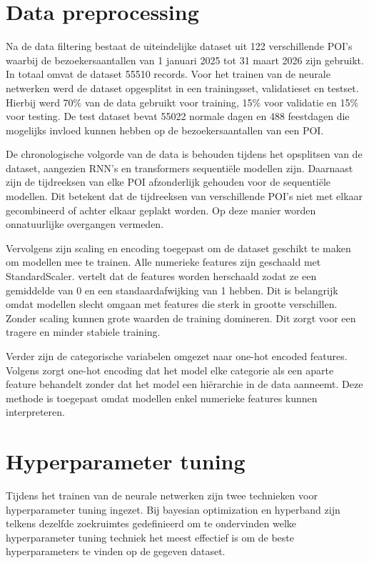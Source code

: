 \section{Data preprocessing}

Na de data filtering bestaat de uiteindelijke dataset uit 122 verschillende POI’s waarbij de bezoekersaantallen van 1 januari 2025 tot 31 maart 2026 zijn gebruikt. In totaal omvat de dataset 55510 records. Voor het trainen van de neurale netwerken werd de dataset opgesplitst in een trainingsset, validatieset en testset. Hierbij werd 70\% van de data gebruikt voor training, 15\% voor validatie en 15\% voor testing. De test dataset bevat 55022 normale dagen en 488 feestdagen die mogelijks invloed kunnen hebben op de bezoekersaantallen van een POI.

De chronologische volgorde van de data is behouden tijdens het opsplitsen van de dataset, aangezien RNN’s en transformers sequentiële modellen zijn. Daarnaast zijn de tijdreeksen van elke POI afzonderlijk gehouden voor de sequentiële modellen. Dit betekent dat de tijdreeksen van verschillende POI’s niet met elkaar gecombineerd of achter elkaar geplakt worden. Op deze manier worden onnatuurlijke overgangen vermeden.

Vervolgens zijn scaling en encoding toegepast om de dataset geschikt te maken om modellen mee te trainen. Alle numerieke features zijn geschaald met StandardScaler. \textcite{Amorim2022} vertelt dat de features worden herschaald zodat ze een gemiddelde van 0 en een standaardafwijking van 1 hebben. Dit is belangrijk omdat modellen slecht omgaan met features die sterk in grootte verschillen. Zonder scaling kunnen grote waarden de training domineren. Dit zorgt voor een tragere en minder stabiele training.

Verder zijn de categorische variabelen omgezet naar one-hot encoded features. Volgens \textcite{JIS2024} zorgt one-hot encoding dat het model elke categorie als een aparte feature behandelt zonder dat het model een hiërarchie in de data aanneemt. Deze methode is toegepast omdat modellen enkel numerieke features kunnen interpreteren.

\section{Hyperparameter tuning}
Tijdens het trainen van de neurale netwerken zijn twee technieken voor hyperparameter tuning ingezet. Bij bayesian optimization en hyperband zijn telkens dezelfde zoekruimtes gedefinieerd om te ondervinden welke hyperparameter tuning techniek het meest effectief is om de beste hyperparameters te vinden op de gegeven dataset. \\

